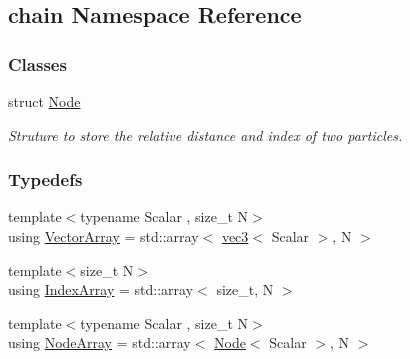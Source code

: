 \hypertarget{namespacechain}{}\subsection{chain Namespace Reference}
\label{namespacechain}
\subsubsection*{Classes}
\begin{DoxyCompactItemize}
\item 
struct \mbox{\hyperlink{structchain_1_1_node}{Node}}
\begin{DoxyCompactList}\small\item\em Struture to store the relative distance and index of two particles. \end{DoxyCompactList}\end{DoxyCompactItemize}
\subsubsection*{Typedefs}
\begin{DoxyCompactItemize}
\item 
{\footnotesize template$<$typename Scalar , size\+\_\+t N$>$ }\\using \mbox{\hyperlink{namespacechain_aa715d2f046187ea9f0c3ea55605d6214}{Vector\+Array}} = std\+::array$<$ \mbox{\hyperlink{structvec3}{vec3}}$<$ Scalar $>$, N $>$
\item 
{\footnotesize template$<$size\+\_\+t N$>$ }\\using \mbox{\hyperlink{namespacechain_aa40d2da395c0ac2bc5f37832442ac403}{Index\+Array}} = std\+::array$<$ size\+\_\+t, N $>$
\item 
{\footnotesize template$<$typename Scalar , size\+\_\+t N$>$ }\\using \mbox{\hyperlink{namespacechain_a3a021b84403e03113e1dcd61ba304963}{Node\+Array}} = std\+::array$<$ \mbox{\hyperlink{structchain_1_1_node}{Node}}$<$ Scalar $>$, N $>$
\end{DoxyCompactItemize}
